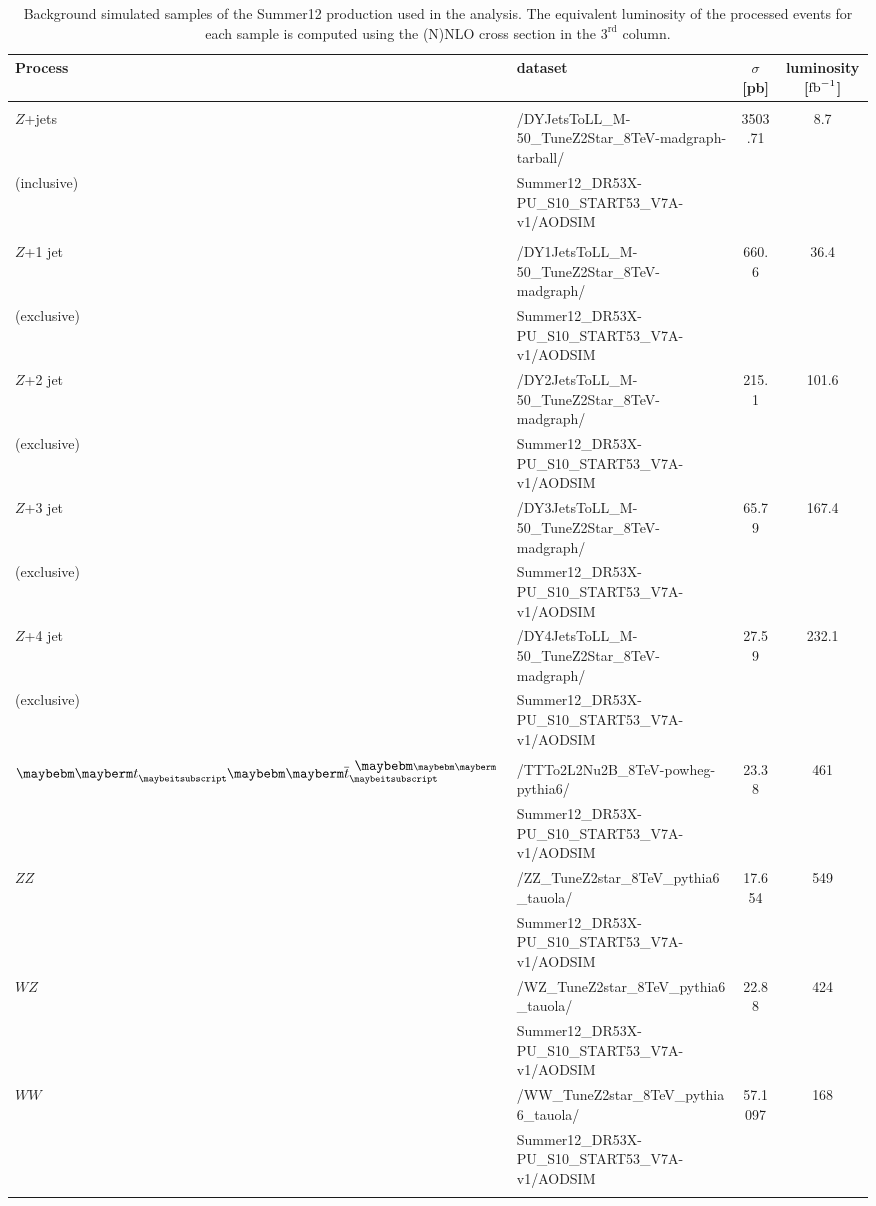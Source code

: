 \begin{table}[htpb]
\caption{ 
Background simulated samples of the Summer12 production used in the analysis.
The equivalent luminosity of the processed events for each sample is 
computed using the (N)NLO cross section in the $3^\mathrm{rd}$ column.
}
\label{table-bkg}
\vspace*{\medskipamount}
\begin{center}
\footnotesize
\begin{tabular}{|l|l|c|c|}
\hline
Process & dataset & $\sigma$ [pb]& luminosity [$\mbox{$\textrm{fb}^{-1}$}$] \\
\hline 
 & & & \\
$Z$+jets       & /DYJetsToLL\_M-50\_TuneZ2Star\_8TeV-madgraph-tarball/ & 3503.71 & 8.7 \\
(inclusive)    & Summer12\_DR53X-PU\_S10\_START53\_V7A-v1/AODSIM & & \\
 & & & \\
$Z$+1 jet      & /DY1JetsToLL\_M-50\_TuneZ2Star\_8TeV-madgraph/ & 660.6 & 36.4\\
(exclusive)    & Summer12\_DR53X-PU\_S10\_START53\_V7A-v1/AODSIM  & & \\
$Z$+2 jet      & /DY2JetsToLL\_M-50\_TuneZ2Star\_8TeV-madgraph/ & 215.1 & 101.6 \\
(exclusive)    & Summer12\_DR53X-PU\_S10\_START53\_V7A-v1/AODSIM  & & \\
$Z$+3 jet      & /DY3JetsToLL\_M-50\_TuneZ2Star\_8TeV-madgraph/ & 65.79 & 167.4 \\
(exclusive)    & Summer12\_DR53X-PU\_S10\_START53\_V7A-v1/AODSIM  & & \\
$Z$+4 jet      & /DY4JetsToLL\_M-50\_TuneZ2Star\_8TeV-madgraph/ & 27.59 & 232.1 \\
(exclusive)    & Summer12\_DR53X-PU\_S10\_START53\_V7A-v1/AODSIM  & & \\
 & & & \\
$\Pqt \Paqt$ & /TTTo2L2Nu2B\_8TeV-powheg-pythia6/ & 23.38 & 461 \\
         & Summer12\_DR53X-PU\_S10\_START53\_V7A-v1/AODSIM  & & \\
$ZZ$ & /ZZ\_TuneZ2star\_8TeV\_pythia6\_tauola/ & 17.654 & 549 \\
     & Summer12\_DR53X-PU\_S10\_START53\_V7A-v1/AODSIM  & & \\
$WZ$ & /WZ\_TuneZ2star\_8TeV\_pythia6\_tauola/ & 22.88 & 424 \\
     & Summer12\_DR53X-PU\_S10\_START53\_V7A-v1/AODSIM  & & \\
$WW$ & /WW\_TuneZ2star\_8TeV\_pythia6\_tauola/ & 57.1097 & 168 \\
     & Summer12\_DR53X-PU\_S10\_START53\_V7A-v1/AODSIM  & & \\
 & & & \\
\hline
\end{tabular}
\end{center}
\end{table}
